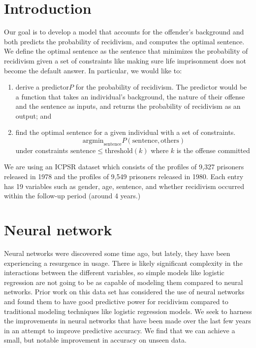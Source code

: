 \documentclass[a0,landscape]{a0poster}
\begin{document}
\begin{multicols}{4}
\section*{Introduction}
Our goal is to develop a model that accounts for the offender's background and both predicts the probability of recidivism, and computes the optimal sentence. We define the optimal sentence as the sentence that minimizes the probability of recidivism given a set of constraints like making sure life imprisonment does not become the default answer. In particular, we would like to:
\begin{enumerate}
\item derive a predictor$ P$ for the probability of recidivism. The predictor would be a function that takes an individual's background, the nature of their offense and the sentence as inputs, and returns the probability of recidivism as an output; and
\item find the optimal sentence for a given individual with a set of constraints.
$$ \text{argmin}_{\text{sentence}} P(\text{sentence}, \text{others}) $$
under constraints $\text{sentence} \leq \text{threshold}(k)$ where $k$ is the offense committed 
\end{enumerate}

We are using an ICPSR dataset which consists of the profiles of 9,327 prisoners released in 1978 and the profiles of 9,549 prisoners released in 1980. Each entry has 19 variables such as gender, age, sentence, and whether recidivism occurred within the follow-up period (around 4 years.)

\color{DarkSlateGray} %

\section*{Neural network}
Neural networks were discovered some time ago, but lately, they have been experiencing a resurgence in usage. There is likely significant complexity in the interactions between the different variables, so simple models like logistic regression are not going to be as capable of modeling them compared to neural networks. Prior work on this data set has considered the use of neural networks and found them to have good predictive power for recidivism compared to traditional modeling techniques like logistic regression models. We seek to harness the improvements in neural networks that have been made over the last few years in an attempt to improve predictive accuracy. We find that we can achieve a small, but notable improvement in accuracy on unseen data.


\end{multicols}
\end{document}

